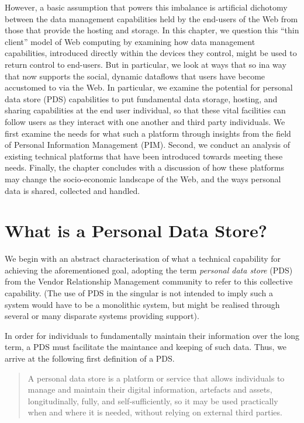 \documentclass[runningheads,a4paper]{llncs}
\begin{document}
However, a basic assumption that powers this imbalance is artificial dichotomy between the data management capabilities held by the end-users of the Web from those that provide the hosting and storage. In this chapter, we question this ``thin client'' model of Web computing by examining how data management capabilities, introduced directly within the devices they control, might be used to return control to end-users.  But in particular, we look at ways that 	 so ina way that now supports the social, dynamic dataflows that users have become accustomed to via the Web.  In particular, we examine the potential for personal data store (PDS) capabilities to put fundamental data storage, hosting, and sharing capabilities at the end user individual, so that these vital facilities can follow users as they interact with one another and third party individuals.  We first examine the needs for what such a platform through insights from the field of Personal Information Management (PIM).  Second, we conduct an analysis of existing technical platforms  that have been introduced towards meeting these needs.  Finally, the chapter concludes with a discussion of how these platforms may change the socio-economic landscape of the Web, and the ways personal data is shared, collected and handled.

\section{What is a Personal Data Store?}

We begin with an abstract characterisation of what a technical capability for achieving the aforementioned goal, adopting the term  \emph{personal data store} (PDS) from the Vendor Relationship Management community \cite{vrm} to refer to this collective capability. (The use of PDS in the singular is not intended to imply such a system would have to be a monolithic system, but might be realised through several or many disparate systems providing support).

In order for individuals to fundamentally maintain their information over the long term, a PDS must facilitate the maintance and keeping of such data. Thus, we arrive at the following first definition of a PDS.

\begin{quote}

	A personal data store is a platform or service that allows individuals to manage and maintain their digital information, artefacts and assets, longitudinally, fully, and self-sufficiently, so it may be used practically when and where it is needed, without relying on external third parties. 

\end{quote}
\end{document}
